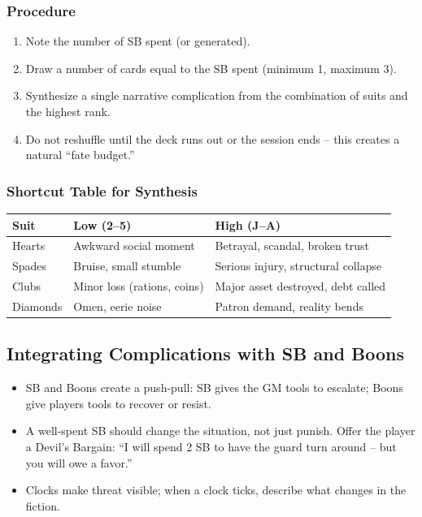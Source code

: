 \subsubsection{Procedure}
\begin{enumerate}
  \item Note the number of SB spent (or generated).
  \item Draw a number of cards equal to the SB spent (minimum 1, maximum 3).
  \item Synthesize a single narrative complication from the combination of suits and the highest rank.
  \item Do not reshuffle until the deck runs out or the session ends – this creates a natural ``fate budget.''
\end{enumerate}

\subsubsection{Shortcut Table for Synthesis}
\begin{tabular}{@{}ll@{}}
\toprule
\textbf{Suit} & \textbf{Low (2–5)} & \textbf{High (J–A)} \\
\midrule
Hearts   & Awkward social moment & Betrayal, scandal, broken trust \\
Spades   & Bruise, small stumble & Serious injury, structural collapse \\
Clubs    & Minor loss (rations, coins) & Major asset destroyed, debt called \\
Diamonds & Omen, eerie noise & Patron demand, reality bends \\
\bottomrule
\end{tabular}

\subsection{Integrating Complications with SB and Boons}

\begin{itemize}
  \item SB and Boons create a push-pull: SB gives the GM tools to escalate; Boons give players tools to recover or resist.
  \item A well-spent SB should change the situation, not just punish. Offer the player a Devil's Bargain: ``I will spend 2 SB to have the guard turn around – but you will owe a favor.''
  \item Clocks make threat visible; when a clock ticks, describe what changes in the fiction.
\end{itemize}

